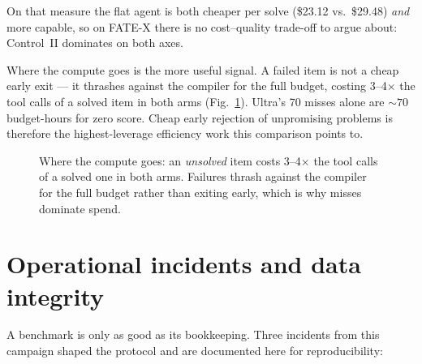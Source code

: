\documentclass[12pt, a4paper]{article}
\begin{document}
On that measure the flat agent is both cheaper per solve (\$23.12 vs.\ \$29.48)
\emph{and} more capable, so on FATE-X there is no cost--quality trade-off to
argue about: Control~II dominates on both axes.

Where the compute goes is the more useful signal. A failed item is not a cheap
early exit --- it thrashes against the compiler for the full budget, costing
3--4$\times$ the tool calls of a solved item in both arms
(Fig.~\ref{fig:thrash}). Ultra's 70 misses alone are ${\sim}70$ budget-hours for
zero score. Cheap early rejection of unpromising problems is therefore the
highest-leverage efficiency work this comparison points to.

\begin{figure}[H]
\centering
{}
\caption{Where the compute goes: an \emph{unsolved} item costs 3--4$\times$ the
tool calls of a solved one in both arms. Failures thrash against the compiler
for the full budget rather than exiting early, which is why misses dominate
spend.}
\label{fig:thrash}
\end{figure}

\section{Operational incidents and data integrity}
\label{sec:incidents}

A benchmark is only as good as its bookkeeping. Three incidents from this
campaign shaped the protocol and are documented here for reproducibility:
\end{document}
